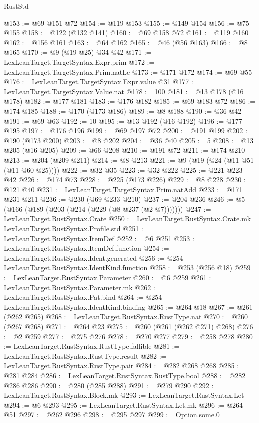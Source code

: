 \begin{lexlean}{RustStd}
\begin{coremodule}
@153 := @69 @151 @72
@154 := @119 @153
@155 := @149 @154
@156 := @75 @155
@158 := @122 (@132 @141)
@160 := @69 @158 @72
@161 := @119 @160
@162 := @156 @161
@163 := @64 @162
@165 := @46 (@56 @163)
@166 := @8 @165
@170 := @9 (@19 @25) @34 @42
@171 := LexLeanTarget.TargetSyntax.Expr.prim
@172 := LexLeanTarget.TargetSyntax.Prim.natLe
@173 := @171 @172
@174 := @69 @55
@176 := LexLeanTarget.TargetSyntax.Expr.value @31
@177 := LexLeanTarget.TargetSyntax.Value.nat
@178 := 100
@181 := @13 @178 (@16 @178)
@182 := @177 @181
@183 := @176 @182
@185 := @69 @183 @72
@186 := @174 @185
@188 := @170 (@173 @186)
@189 := @8 @188
@190 := @36 @42
@191 := @69 @63
@192 := 10
@195 := @13 @192 (@16 @192)
@196 := @177 @195
@197 := @176 @196
@199 := @69 @197 @72
@200 := @191 @199
@202 := @190 (@173 @200)
@203 := @8 @202
@204 := @36 @40
@205 := 5
@208 := @13 @205 (@16 @205)
@209 := @66 @208
@210 := @191 @72
@211 := @174 @210
@213 := @204 (@209 @211)
@214 := @8 @213
@221 := @9 (@19 (@24 (@11 @51 (@11 @60 @25))))
@222 := @32 @35
@223 := @32 @222
@225 := @221 @223 @42
@226 := @174 @73
@228 := @225 (@173 @226)
@229 := @8 @228
@230 := @121 @40
@231 := LexLeanTarget.TargetSyntax.Prim.natAdd
@233 := @171 @231 @211
@236 := @230 (@69 @233 @210)
@237 := @204 @236
@246 := @5 (@166 (@189 (@203 (@214 (@229 (@8 @237 (@2 @7)))))))
@247 := LexLeanTarget.RustSyntax.Crate
@250 := LexLeanTarget.RustSyntax.Crate.mk LexLeanTarget.RustSyntax.Profile.std
@251 := LexLeanTarget.RustSyntax.ItemDef
@252 := @6 @251
@253 := LexLeanTarget.RustSyntax.ItemDef.function
@254 := LexLeanTarget.RustSyntax.Ident.generated
@256 := @254 LexLeanTarget.RustSyntax.IdentKind.function
@258 := @253 (@256 @18)
@259 := LexLeanTarget.RustSyntax.Parameter
@260 := @6 @259
@261 := LexLeanTarget.RustSyntax.Parameter.mk
@262 := LexLeanTarget.RustSyntax.Pat.bind
@264 := @254 LexLeanTarget.RustSyntax.IdentKind.binding
@265 := @264 @18
@267 := @261 (@262 @265)
@268 := LexLeanTarget.RustSyntax.RustType.nat
@270 := @260 (@267 @268)
@271 := @264 @23
@275 := @260 (@261 (@262 @271) @268)
@276 := @2 @259
@277 := @275 @276
@278 := @270 @277
@279 := @258 @278
@280 := LexLeanTarget.RustSyntax.RustType.fallible
@281 := LexLeanTarget.RustSyntax.RustType.result
@282 := LexLeanTarget.RustSyntax.RustType.pair
@284 := @282 @268 @268
@285 := @281 @284
@286 := LexLeanTarget.RustSyntax.RustType.bool
@288 := @282 @286 @286
@290 := @280 (@285 @288)
@291 := @279 @290
@292 := LexLeanTarget.RustSyntax.Block.mk
@293 := LexLeanTarget.RustSyntax.Let
@294 := @6 @293
@295 := LexLeanTarget.RustSyntax.Let.mk
@296 := @264 @51
@297 := @262 @296
@298 := @295 @297
@299 := Option.some.{0}

\end{coremodule}
\end{lexlean}
